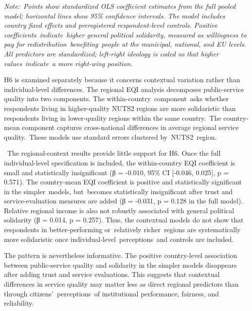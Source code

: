 \documentclass[12pt]{article}
\begin{document}
\emph{Note:~Points show standardized OLS coefficient estimates from the
full pooled model; horizontal lines show 95\% confidence intervals. The
model includes country fixed effects and preregistered respondent-level
controls. Positive coefficients~indicate~higher general political
solidarity, measured as willingness to pay for
redistribution~benefiting~people at the municipal, national, and EU
levels. All predictors are standardized; left-right ideology is coded so
that higher values~indicate~a more right-wing position.~}

H6 is examined separately because it concerns contextual variation
rather than individual-level differences. The regional EQI analysis
decomposes public-service quality into two components. The
within-country~component~asks whether respondents living in
higher-quality NUTS2 regions are more solidaristic than respondents
living in lower-quality regions within the same country.~The
country-mean component captures cross-national differences in average
regional service quality.~These models use standard errors clustered
by~NUTS2~region.~

~The regional-context results provide little support for H6. Once the
full individual-level specification is included, the within-country EQI
coefficient is small and statistically insignificant (β = -0.010, 95\%
CI {[}-0.046, 0.025{]}, p = 0.571). The country-mean EQI coefficient is
positive and statistically significant in the simpler~models,
but~becomes statistically insignificant after trust and
service-evaluation measures are added (β = -0.031, p = 0.128 in the full
model). Relative regional income is also not robustly associated with
general political solidarity (β = 0.014, p = 0.257). Thus, the
contextual models do not show that respondents in better-performing
or~relatively richer~regions are systematically more solidaristic once
individual-level~perceptions~and controls are included.~

The pattern is nevertheless informative. The positive country-level
association between public-service quality and solidarity in the simpler
models disappears after adding trust and service evaluations. This
suggests that contextual differences in service quality may matter less
as direct regional predictors than through citizens'~perceptions~of
institutional performance, fairness, and reliability.~
\end{document}
